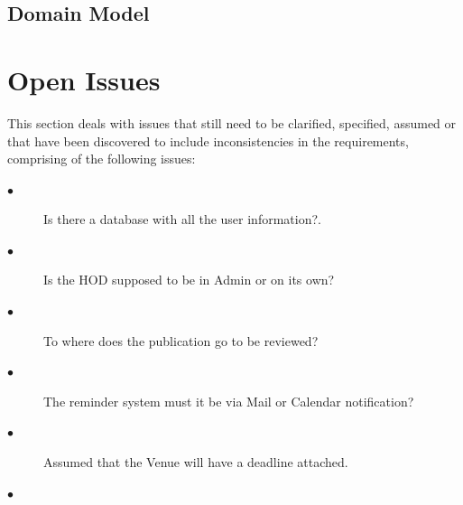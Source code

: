 \documentclass[a4paper]{article}
\begin{document}
	\subsection{Domain Model}
	
	
	\section{Open Issues}
	This section deals with issues that still need to be clarified, specified, assumed or that have been discovered to include inconsistencies in the requirements, comprising of the following issues:
	\begin{description}
		\item[$\bullet$] Is there a database with all the user information?.
	\end{description}
	\begin{description}
		\item[$\bullet$] Is the HOD supposed to be in Admin or on its own?
	\end{description}
	\begin{description}
	\item[$\bullet$] To where does the publication go to be reviewed?
	\end{description}
	\begin{description}
	\item[$\bullet$] The reminder system must it be via Mail or Calendar notification?
	\end{description}
	\begin{description}
	\item[$\bullet$] Assumed that the Venue will have a deadline attached.
	\end{description}
	\begin{description}
	\item[$\bullet$] 
	\end{description}	
\end{document}
